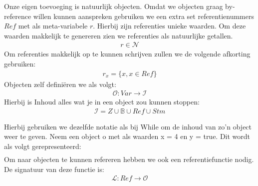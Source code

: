 \documentclass[12pt]{article}
\begin{document}
Onze eigen toevoeging is natuurlijk objecten. Omdat we objecten graag by-reference willen kunnen aanspreken gebruiken we een extra set referentienummers $Ref$ met als meta-variabele $r$. Hierbij zijn referenties unieke waarden. Om deze waarden makkelijk te genereren zien we referenties als natuurlijke getallen. 
\begin{gather*}
r \in \mathcal{N}
\end{gather*}
Om referenties makkelijk op te kunnen schrijven zullen we de volgende afkorting gebruiken:
\begin{gather*}
r_x = \{x, x \in Ref\}
\end{gather*}
Objecten zelf definiëren we als volgt:
\begin{gather*}\mathcal{O} : Var \rightarrow \mathcal{I} \end{gather*}
Hierbij is Inhoud alles wat je in een object zou kunnen stoppen: 
\begin{gather*}\mathcal{I} = Z \cup \mathds{B} \cup Ref \cup Stm \end{gather*} 

Hierbij gebruiken we dezelfde notatie als bij While om de inhoud van zo'n object weer te geven.
Neem een object o met als waarden x = 4 en y = true. Dit wordt als volgt gerepresenteerd:
\begin{gather*}[x \mapsto 4, y \mapsto tt]\end{gather*}
Om naar objecten te kunnen refereren hebben we ook een referentiefunctie nodig. De signatuur van deze functie is:
\begin{gather*}\mathcal{L} : Ref \rightarrow \mathcal{O}\end{gather*}	
\end{document}
